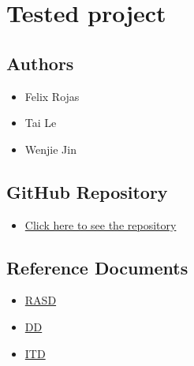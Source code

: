 \chapter{Tested project}

\section*{Authors}
\begin{itemize}
    \item Felix Rojas
    \item Tai Le
    \item Wenjie Jin
\end{itemize}

\section*{GitHub Repository}
\begin{itemize}
    \item \href{https://github.com/felixsrp/RojasJinLe}{Click here to see the repository}
\end{itemize}

\section*{Reference Documents}
\begin{itemize}
    \item \href{https://github.com/felixsrp/RojasJinLe/blob/main/DeliveryFolder/RASDv4.pdf}{RASD}
    \item \href{https://github.com/felixsrp/RojasJinLe/blob/main/DeliveryFolder/DDv3.pdf}{DD}
    \item \href{https://github.com/felixsrp/RojasJinLe/blob/main/DeliveryFolder/ITDv1.pdf}{ITD}
\end{itemize}